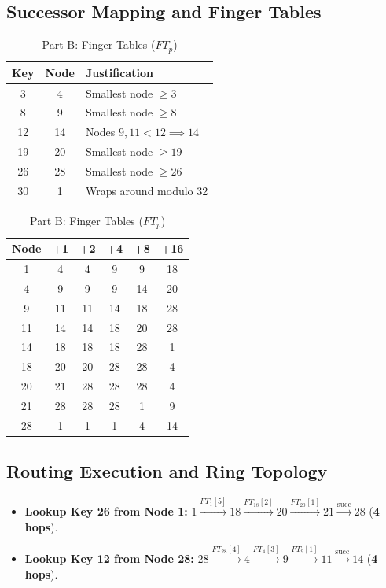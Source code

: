 \documentclass[11pt,a4paper]{article}
\begin{document}
\subsection{Successor Mapping and Finger Tables}

\begin{table}[H]
\centering
\begin{minipage}{0.45\textwidth}
\caption{Part A: Key-to-Node Mapping}
\label{tab:chord_partA}
\centering\footnotesize
\begin{tabular}{ccl}
\toprule
\textbf{Key} & \textbf{Node} & \textbf{Justification} \\
\midrule
3  & 4  & Smallest node $\ge 3$ \\
8  & 9  & Smallest node $\ge 8$ \\
12 & 14 & Nodes $9,11 < 12 \implies 14$ \\
19 & 20 & Smallest node $\ge 19$ \\
26 & 28 & Smallest node $\ge 26$ \\
30 & 1  & Wraps around modulo 32 \\
\bottomrule
\end{tabular}
\end{minipage}
\hfill
\begin{minipage}{0.52\textwidth}
\caption{Part B: Finger Tables ($FT_p$)}
\label{tab:chord_fingers}
\centering\footnotesize
\begin{tabular}{cccccc}
\toprule
\textbf{Node} & \textbf{+1} & \textbf{+2} & \textbf{+4} & \textbf{+8} & \textbf{+16} \\
\midrule
1  & 4  & 4  & 9  & 9  & 18 \\
4  & 9  & 9  & 9  & 14 & 20 \\
9  & 11 & 11 & 14 & 18 & 28 \\
11 & 14 & 14 & 18 & 20 & 28 \\
14 & 18 & 18 & 18 & 28 & 1  \\
18 & 20 & 20 & 28 & 28 & 4  \\
20 & 21 & 28 & 28 & 28 & 4  \\
21 & 28 & 28 & 28 & 1  & 9  \\
28 & 1  & 1  & 1  & 4  & 14 \\
\bottomrule
\end{tabular}
\end{minipage}
\end{table}

\subsection{Routing Execution and Ring Topology}
\begin{itemize}[leftmargin=*,itemsep=1pt]
  \item \textbf{Lookup Key 26 from Node 1:} $1 \xrightarrow{FT_1[5]} 18 \xrightarrow{FT_{18}[2]} 20 \xrightarrow{FT_{20}[1]} 21 \xrightarrow{\text{succ}} 28$ (\textbf{4 hops}).
  \item \textbf{Lookup Key 12 from Node 28:} $28 \xrightarrow{FT_{28}[4]} 4 \xrightarrow{FT_4[3]} 9 \xrightarrow{FT_9[1]} 11 \xrightarrow{\text{succ}} 14$ (\textbf{4 hops}).
\end{itemize}
\end{document}
